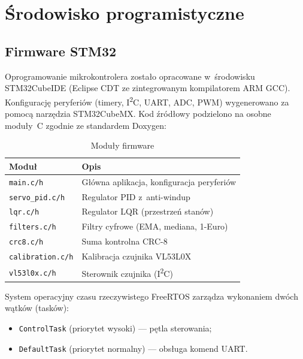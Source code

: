 \section{Środowisko programistyczne}

\subsection{Firmware STM32}

Oprogramowanie mikrokontrolera zostało opracowane w~środowisku
STM32CubeIDE (Eclipse CDT ze zintegrowanym kompilatorem ARM GCC).
Konfigurację peryferiów (timery, I\textsuperscript{2}C, UART, ADC, PWM)
wygenerowano za pomocą narzędzia STM32CubeMX.
Kod źródłowy podzielono na osobne moduły~C zgodnie ze standardem Doxygen:

\begin{table}[H]
  \centering
  \caption{Moduły firmware}
  \label{tab:moduly}
  \begin{tabular}{ll}
    \toprule
    \textbf{Moduł}           & \textbf{Opis}                              \\
    \midrule
    \texttt{main.c/h}        & Główna aplikacja, konfiguracja peryferiów  \\
    \texttt{servo\_pid.c/h}  & Regulator PID z~anti-windup                \\
    \texttt{lqr.c/h}         & Regulator LQR (przestrzeń stanów)          \\
    \texttt{filters.c/h}     & Filtry cyfrowe (EMA, mediana, 1-Euro)      \\
    \texttt{crc8.c/h}        & Suma kontrolna CRC-8                       \\
    \texttt{calibration.c/h} & Kalibracja czujnika VL53L0X                \\
    \texttt{vl53l0x.c/h}     & Sterownik czujnika (I\textsuperscript{2}C) \\
    \bottomrule
  \end{tabular}
\end{table}

System operacyjny czasu rzeczywistego FreeRTOS zarządza wykonaniem dwóch
wątków (tasków):
\begin{itemize}
  \item \texttt{ControlTask} (priorytet wysoki) — pętla sterowania;
  \item \texttt{DefaultTask} (priorytet normalny) — obsługa komend UART.
\end{itemize}

